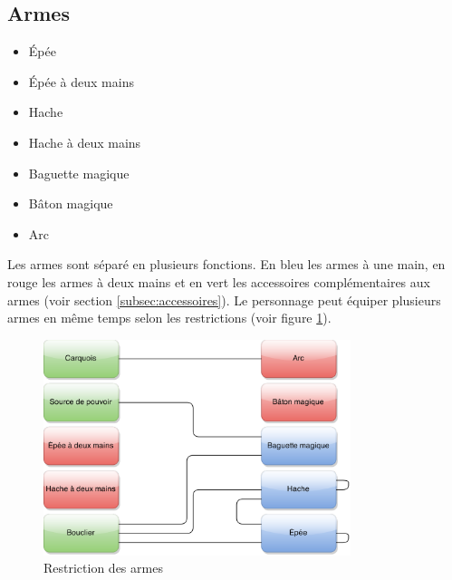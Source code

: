 \documentclass[11pt, a4paper, oneside]{report}
\begin{document}
\subsection{Armes}
\begin{multicols}{2}
\begin{itemize}
    \item Épée
    \item Épée à deux mains
    \item Hache
    \item Hache à deux mains
    \item Baguette magique
    \item Bâton magique
    \item Arc
\end{itemize}
\end{multicols}
Les armes sont séparé en plusieurs fonctions. En bleu les armes à une main, en rouge les armes à deux mains et en vert les accessoires complémentaires aux armes (voir section \ref{subsec:accessoires}).
Le personnage peut équiper plusieurs armes en même temps selon les restrictions (voir figure \ref{fig:EquipmentRestrictions}).
\begin{figure}[ht]
	\begin{center}
	\includegraphics[width=0.8\textwidth]{EquipmentRestrictions}
	\caption{Restriction des armes}
	\label{fig:EquipmentRestrictions}
	\end{center}
\end{figure}
\end{document}
